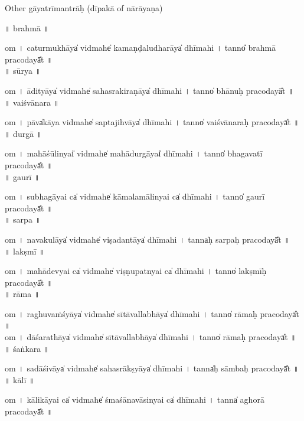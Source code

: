 \documentclass[parskip, DIV=14]{scrartcl}
\begin{document}
\newpage
\LARGE  Other gāyatrīmantrāḥ (dīpakā of nārāyaṇa)

\Large 
\vspace{1.501cm} ॥   brahmā  ॥ \par
  om  । ca॒tu॒rmu॒khāya̍ vi॒dmahe̍ kamaṇḍaludha॒rāya̍ dhīmahi  ।  tanno̎ brahmā praco॒dayā̎t ॥ \\

\vspace{0.201cm} ॥   sūrya  ॥ \par
  om  । ā॒di॒tyāya̍ vi॒dmahe̍ sahasrakira॒ṇāya̍ dhīmahi  ।  tanno̍ bhānuḥ praco॒dayā̎t ॥ \\

\vspace{0.201cm} ॥   vaiśvānara ॥ \par
  om  । pāva̍kāya vi॒dmahe̍ saptaji॒hvāya̍ dhīmahi  ।  tanno̍ vaiśvānaraḥ praco॒dayā̎t ॥ \\

\vspace{0.201cm} ॥   durgā  ॥ \par
  om  । ma॒hā॒śū॒linyai̍ vi॒dmahe̍ mahādu॒rgāyai̍ dhīmahi  ।  tanno̍ bhagavatī praco॒dayā̎t ॥ \\

\vspace{0.201cm} ॥   gaurī  ॥ \par
  om  । su॒bha॒gā॒yai ca̍ vi॒dmahe̍ kāmalamāli॒nyai ca̍ dhīmahi  ।  tanno̍ gaurī praco॒dayā̎t ॥ \\

\vspace{0.201cm} ॥   sarpa ॥ \par
  om  । na॒va॒ku॒lāya̍ vi॒dmahe̍ viṣada॒ntāya̍ dhīmahi  ।  tanna̍ḥ sarpaḥ praco॒dayā̎t ॥ \\

\vspace{0.201cm} ॥   lakṣmī  ॥ \par
  om  । ma॒hā॒de॒vyai ca̍ vi॒dmahe̍ viṣṇupa॒tnyai ca̍ dhīmahi   ।  tanno̍ lakṣmīḥ praco॒dayā̎t ॥ \\

\vspace{0.201cm} ॥   rāma  ॥ \par
  om  । ra॒ghu॒va॒ṁśyāya̍ vi॒dmahe̍ sītāvalla॒bhāya̍ dhīmahi  ।  tanno̍ rāmaḥ praco॒dayā̎t ॥ \\
  om  । dā॒śa॒ra॒thāya̍ vi॒dmahe̍ sītāvalla॒bhāya̍ dhīmahi  ।  tanno̍ rāmaḥ praco॒dayā̎t ॥ \\

\vspace{0.201cm} ॥   śaṅkara  ॥ \par
  om  । sa॒dā॒śi॒vāya̍ vi॒dmahe̍ sahasrā॒kṣyāya̍ dhīmahi  ।  tanna̍ḥ sāmbaḥ praco॒dayā̎t ॥ \\

\vspace{0.201cm} ॥   kālī  ॥ \par
  om  । kā॒li॒kā॒yai ca̍ vi॒dmahe̍ śmaśānavāsi॒nyai ca̍ dhīmahi  ।  tanna̍ aghorā praco॒dayā̎t ॥ \\
\end{document}
